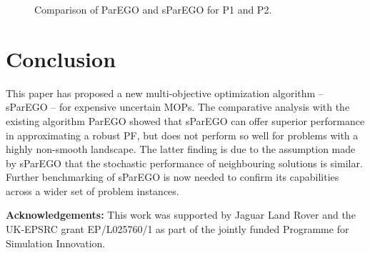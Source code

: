 \documentclass{llncs}
\begin{document}
\begin{figure}
{ \label{fig:P1_PF_comparison-b}
}
\hspace{1cm}
\caption{Comparison of ParEGO and sParEGO for P1 and P2.}
\label{fig:algorithms_comparison}
\end{figure}

\section{Conclusion}\label{sec:conclusion}

This paper has proposed a new multi-objective optimization algorithm -- sParEGO -- for expensive uncertain MOPs. The comparative analysis with the existing algorithm ParEGO showed that sParEGO can offer superior performance in approximating a robust PF, but does not perform so well for problems with a highly non-smooth landscape. The latter finding is due to the assumption made by sParEGO that the stochastic performance of neighbouring solutions is similar. Further benchmarking of sParEGO is now needed to confirm its capabilities across a wider set of problem instances.
\vspace{2mm}

\textbf{Acknowledgements: }This work was supported by Jaguar Land Rover and the UK-EPSRC grant EP/L025760/1 as part of the jointly funded Programme for Simulation Innovation.

\small{


}
\end{document}
